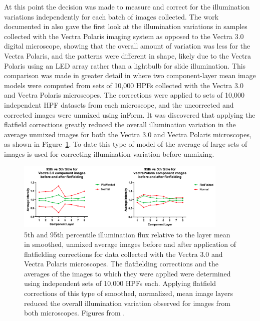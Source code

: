 \documentclass[letterpaper,11pt]{article}
\newcommand{\reffig}[1]{Figure~\ref{#1}}
\begin{document}
At this point the decision was made to measure and correct for the illumination variations independently for each batch of images collected. The work documented in \cite{Ben_flatfielding_1} also gave the first look at the illumination variations in samples collected with the Vectra Polaris imaging system as opposed to the Vectra 3.0 digital microscope, showing that the overall amount of variation was less for the Vectra Polaris, and the patterns were different in shape, likely due to the Vectra Polaris using an LED array rather than a lightbulb for slide illumination. This comparison was made in greater detail in \cite{Ben_flatfielding_2} where two component-layer mean image models were computed from sets of 10,000 HPFs collected with the Vectra 3.0 and Vectra Polaris microscopes. The corrections were applied to sets of 10,000 independent HPF datasets from each microscope, and the uncorrected and corrected images were unmixed using inForm. It was discovered that applying the flatfield corrections greatly reduced the overall illumination variation in the average unmixed images for both the Vectra 3.0 and Vectra Polaris microscopes, as shown in \reffig{fig:fourth_flatfielding}. To date this type of model of the average of large sets of images is used for correcting illumination variation before unmixing.

\begin{figure}[!ht]
\centering
\includegraphics[width=0.9\textwidth]{images/introduction/fourth_flatfield_impact}
\caption{\footnotesize 5th and 95th percentile illumination flux relative to the layer mean in smoothed, unmixed average images before and after application of flatfielding corrections for data collected with the Vectra 3.0 and Vectra Polaris microscopes. The flatfielding corrections and the averages of the images to which they were applied were determined using independent sets of 10,000 HPFs each. Applying flatfield corrections of this type of smoothed, normalized, mean image layers reduced the overall illumination variation observed for images from both microscopes. Figures from \cite{Ben_flatfielding_1}.}
\label{fig:fourth_flatfielding}
\end{figure}
\end{document}
